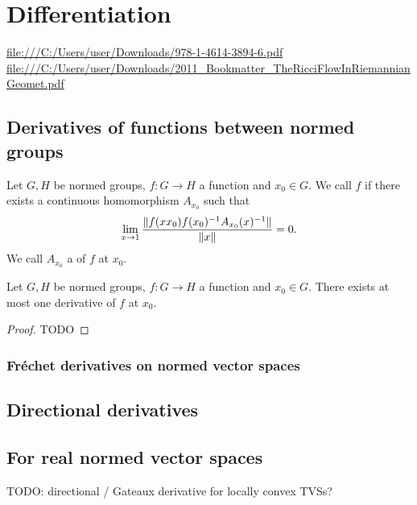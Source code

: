 \chapter{Differentiation}
\url{file:///C:/Users/user/Downloads/978-1-4614-3894-6.pdf}
\url{file:///C:/Users/user/Downloads/2011_Bookmatter_TheRicciFlowInRiemannianGeomet.pdf}

\section{Derivatives of functions between normed groups}
\begin{definition}
Let $G, H$ be normed groups, $f:G\to H$ a function and $x_0\in G$. We call $f$  if there exists a continuous homomorphism $A_{x_0}$ such that
\[ \lim_{x\to 1}\frac{\lVert f(xx_0)f(x_0)^{-1}A_{x_0}(x)^{-1}\rVert}{\lVert x\rVert} = 0. \]
We call $A_{x_0}$ a  of $f$ at $x_0$.
\end{definition}

\begin{proposition}
Let $G, H$ be normed groups, $f:G\to H$ a function and $x_0\in G$. There exists at most one derivative of $f$ at $x_0$.
\end{proposition}
\begin{proof}
TODO
\end{proof}

\subsection{Fréchet derivatives on normed vector spaces}

\section{Directional derivatives}

\section{For real normed vector spaces}
TODO: directional / Gateaux derivative for locally convex TVSs?
